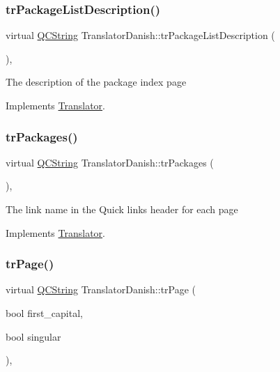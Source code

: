 \subsubsection{\texorpdfstring{trPackageListDescription()}{trPackageListDescription()}}
{\footnotesize\ttfamily virtual \mbox{\hyperlink{class_q_c_string}{Q\+C\+String}} Translator\+Danish\+::tr\+Package\+List\+Description (\begin{DoxyParamCaption}{ }\end{DoxyParamCaption})\hspace{0.3cm}{\ttfamily [inline]}, {\ttfamily [virtual]}}

The description of the package index page 

Implements \mbox{\hyperlink{class_translator}{Translator}}.

\mbox{\label{class_translator_danish_ade8313084d14f2dac2cae5499a980000}} 
\subsubsection{\texorpdfstring{trPackages()}{trPackages()}}
{\footnotesize\ttfamily virtual \mbox{\hyperlink{class_q_c_string}{Q\+C\+String}} Translator\+Danish\+::tr\+Packages (\begin{DoxyParamCaption}{ }\end{DoxyParamCaption})\hspace{0.3cm}{\ttfamily [inline]}, {\ttfamily [virtual]}}

The link name in the Quick links header for each page 

Implements \mbox{\hyperlink{class_translator}{Translator}}.

\mbox{\label{class_translator_danish_a1256474293033a84f1e9e1a50117e6ad}} 
\subsubsection{\texorpdfstring{trPage()}{trPage()}}
{\footnotesize\ttfamily virtual \mbox{\hyperlink{class_q_c_string}{Q\+C\+String}} Translator\+Danish\+::tr\+Page (\begin{DoxyParamCaption}\item[{bool}]{first\+\_\+capital,  }\item[{bool}]{singular }\end{DoxyParamCaption})\hspace{0.3cm}{\ttfamily [inline]}, {\ttfamily [virtual]}}

